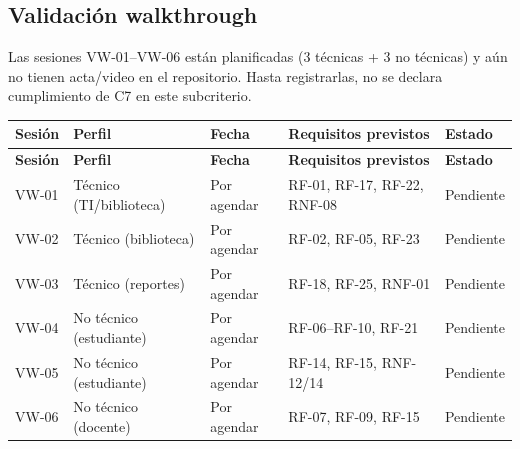 \documentclass[12pt,journal,onecolumn]{IEEEtran}
\begin{document}
\subsection{Validación walkthrough}
Las sesiones VW-01--VW-06 están planificadas (3 técnicas + 3 no técnicas) y aún no tienen acta/video en el repositorio. Hasta registrarlas, no se declara cumplimiento de C7 en este subcriterio.
\begin{longtable}{P{0.12\textwidth}P{0.22\textwidth}P{0.18\textwidth}P{0.22\textwidth}P{0.18\textwidth}}\toprule
\textbf{Sesión} & \textbf{Perfil} & \textbf{Fecha} & \textbf{Requisitos previstos} & \textbf{Estado}\\\midrule\endfirsthead
\toprule\textbf{Sesión} & \textbf{Perfil} & \textbf{Fecha} & \textbf{Requisitos previstos} & \textbf{Estado}\\\midrule\endhead
VW-01 & Técnico (TI/biblioteca) & Por agendar & RF-01, RF-17, RF-22, RNF-08 & Pendiente\\
VW-02 & Técnico (biblioteca) & Por agendar & RF-02, RF-05, RF-23 & Pendiente\\
VW-03 & Técnico (reportes) & Por agendar & RF-18, RF-25, RNF-01 & Pendiente\\
VW-04 & No técnico (estudiante) & Por agendar & RF-06--RF-10, RF-21 & Pendiente\\
VW-05 & No técnico (estudiante) & Por agendar & RF-14, RF-15, RNF-12/14 & Pendiente\\
VW-06 & No técnico (docente) & Por agendar & RF-07, RF-09, RF-15 & Pendiente\\\bottomrule
\end{longtable}
\end{document}
